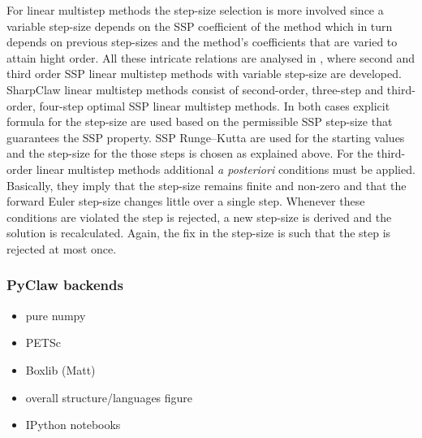 For linear multistep methods the step-size selection is more involved since a variable step-size depends on
the SSP coefficient of the method which in turn depends on previous step-sizes and the method's coefficients 
that are varied to attain hight order. 
All these intricate relations are analysed in , where second and third order SSP linear
multistep methods with variable step-size are developed.
SharpClaw linear multistep methods consist of second-order, three-step and third-order, four-step optimal 
SSP linear multistep methods.
In both cases explicit formula for the step-size are used based on the permissible SSP step-size that 
guarantees the SSP property.
SSP Runge--Kutta are used for the starting values and the step-size for the those steps is chosen as
explained above.
For the third-order linear multistep methods additional {\em a posteriori} conditions must be applied.
Basically, they imply that the step-size remains finite and non-zero and that the forward Euler step-size
changes little over a single step.
Whenever these conditions are violated the step is rejected, a new step-size is derived and the solution is
recalculated.
Again, the fix in the step-size is such that the step is rejected at most once.

\subsubsection{PyClaw backends}
\begin{itemize}
    \item pure numpy
    \item PETSc
    \item Boxlib (Matt)
\end{itemize}

\begin{itemize}
    \item overall structure/languages figure
    \item IPython notebooks
\end{itemize}
